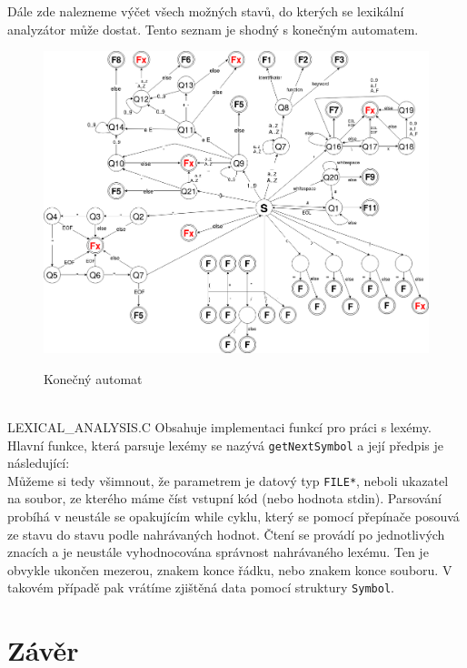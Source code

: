 \documentclass[a4paper,11pt]{article}
\begin{document}
Dále zde nalezneme výčet všech možných stavů, do kterých se lexikální analyzátor může dostat. Tento seznam je shodný s konečným automatem. \\

\begin{figure}[h]
\begin{center}
{\scalebox{0.5}
{\includegraphics{ka.png}}}
\label{obr}
\caption{Konečný automat}
\end{center}
\end{figure}
\\

LEXICAL_ANALYSIS.C
Obsahuje implementaci funkcí pro práci s lexémy. Hlavní funkce, která parsuje lexémy se nazývá \texttt{getNextSymbol} a její předpis je následující: \\
Můžeme si tedy všimnout, že parametrem je datový typ \texttt{FILE*}, neboli ukazatel na soubor, ze kterého máme číst vstupní kód (nebo hodnota stdin).
Parsování probíhá v neustále se opakujícím while cyklu, který se pomocí přepínače posouvá ze stavu do stavu podle nahrávaných hodnot. Čtení se provádí po jednotlivých znacích a je neustále vyhodnocována správnost nahrávaného lexému. Ten je obvykle ukončen mezerou, znakem konce řádku, nebo znakem konce souboru. V takovém případě pak vrátíme zjištěná data pomocí struktury \texttt{Symbol}.



\section{Závěr}



\newpage

\end{document}
